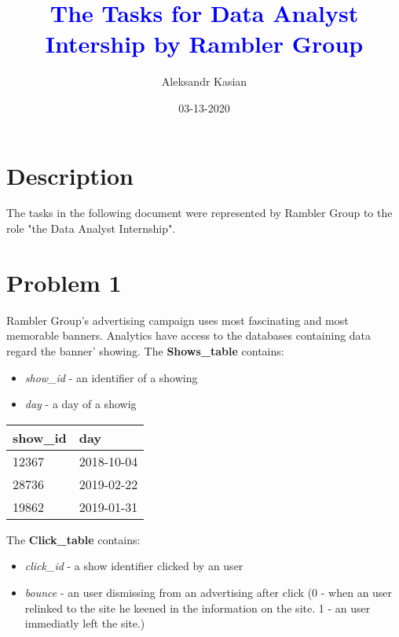 \documentclass[12pt, a4paper]{article}
\title{\textcolor{blue}{The Tasks for Data Analyst Intership by Rambler Group}}
\date{03-13-2020}
\author{Aleksandr Kasian}
\begin{document}
\begin{titlepage}
	\maketitle
\end{titlepage}
\newpage

\tableofcontents

\newpage

\section*{Description}
%
The tasks in the following document were represented by Rambler Group to the role "the Data Analyst Internship".

\section*{Problem 1}
%
Rambler Group's advertising campaign uses most fascinating and most memorable banners.
Analytics have access to the databases containing data regard the banner' showing.
The \textbf{Shows\_table} contains:
\begin{itemize}
	\item \emph{show\_id} - an identifier of a showing 
	\item \emph{day} - a day of a showig
\end{itemize}

\begin{table}[h]
	\begin{tabular}{|l|l|}
	\hline
	show\_id & day        \\ \hline
	12367    & 2018-10-04 \\ \hline
	28736    & 2019-02-22 \\ \hline
	19862    & 2019-01-31 \\ \hline
	\end{tabular}
\end{table}

\noindent
The \textbf{Click\_table} contains:
\begin{itemize}
	\item \emph{click\_id} - a show identifier clicked by an user
	\item \emph{bounce} - an user dismissing from an advertising after click (0 - when an user relinked to the site 
	he keened in the information on the site. 1 - an user immediatly left the site.)
\end{itemize}
\end{document}
